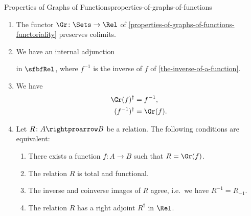 \begin{proposition}{Properties of Graphs of Functions}{properties-of-graphs-of-functions}
\begin{enumerate}
            \begin{webcompile}
                \Adjunction#\Gr#_{!}#\Sets#\Rel,#
            \end{webcompile}%
            witnessed by a bijection of sets%
            \[
                \Rel(\Gr(A),B)
                \cong
                \Sets(A,\mathcal{P}(B))
            \]%
            natural in $A\in\Obj(\Sets)$ and $B\in\Obj(\Rel)$.
        \item\label{properties-of-graphs-of-functions-cocontinuity}The functor $\Gr\colon\Sets\to\Rel$ of \cref{properties-of-graphs-of-functions-functoriality} preserves colimits.
        \item\label{properties-of-graphs-of-functions-adjointness-inside-sfbfrel}We have an internal adjunction
            in $\sfbfRel$, where $f^{-1}$ is the inverse of $f$ of \cref{the-inverse-of-a-function}.
        \item\label{properties-of-graphs-of-functions-interaction-with-converses}We have
            \begin{align*}
                \Gr(f)^{\dagger}   &= f^{-1},\\
                (f^{-1})^{\dagger} &= \Gr(f).
            \end{align*}
        \item\label{properties-of-graphs-of-functions-characterisations}Let $R\colon A\rightproarrow B$ be a relation. The following conditions are equivalent:
            \begin{enumerate}
                \item\label{properties-of-graphs-of-functions-characterisations-1}There exists a function $f\colon A\to B$ such that $R=\Gr(f)$.
                \item\label{properties-of-graphs-of-functions-characterisations-2}The relation $R$ is total and functional.
                \item\label{properties-of-graphs-of-functions-characterisations-3}The inverse and coinverse images of $R$ agree, i.e.\ we have $R^{-1}=R_{-1}$.
                \item\label{properties-of-graphs-of-functions-characterisations-4}The relation $R$ has a right adjoint $R^{\dagger}$ in $\Rel$.
            \end{enumerate}
    \end{enumerate}
\end{proposition}

